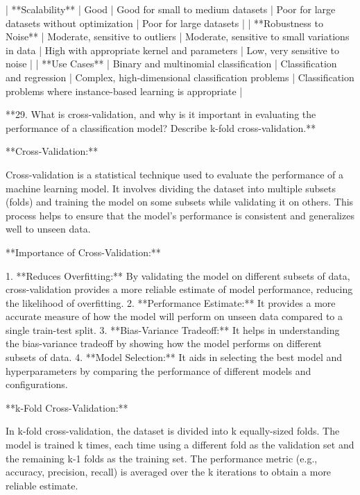 | **Scalability**           | Good                                        | Good for small to medium datasets                | Poor for large datasets without optimization      | Poor for large datasets                           |
| **Robustness to Noise**   | Moderate, sensitive to outliers             | Moderate, sensitive to small variations in data  | High with appropriate kernel and parameters       | Low, very sensitive to noise                      |
| **Use Cases**             | Binary and multinomial classification       | Classification and regression                    | Complex, high-dimensional classification problems | Classification problems where instance-based learning is appropriate |

 **29. What is cross-validation, and why is it important in evaluating the performance of a classification model? Describe k-fold cross-validation.**

**Cross-Validation:**

Cross-validation is a statistical technique used to evaluate the performance of a machine learning model. It involves dividing the dataset into multiple subsets (folds) and training the model on some subsets while validating it on others. This process helps to ensure that the model's performance is consistent and generalizes well to unseen data.

**Importance of Cross-Validation:**

1. **Reduces Overfitting:** By validating the model on different subsets of data, cross-validation provides a more reliable estimate of model performance, reducing the likelihood of overfitting.
2. **Performance Estimate:** It provides a more accurate measure of how the model will perform on unseen data compared to a single train-test split.
3. **Bias-Variance Tradeoff:** It helps in understanding the bias-variance tradeoff by showing how the model performs on different subsets of data.
4. **Model Selection:** It aids in selecting the best model and hyperparameters by comparing the performance of different models and configurations.

**k-Fold Cross-Validation:**

In k-fold cross-validation, the dataset is divided into k equally-sized folds. The model is trained k times, each time using a different fold as the validation set and the remaining k-1 folds as the training set. The performance metric (e.g., accuracy, precision, recall) is averaged over the k iterations to obtain a more reliable estimate.

